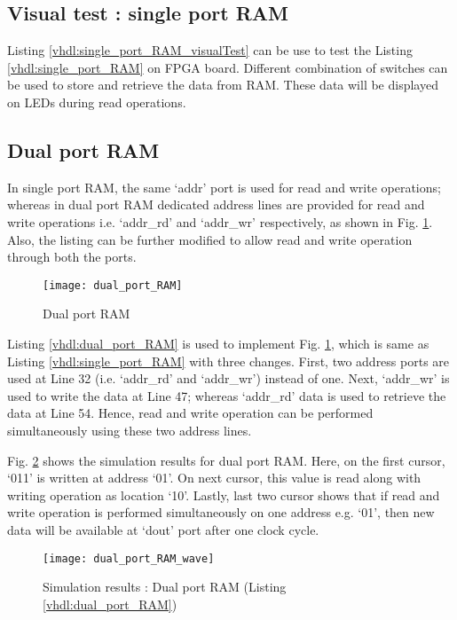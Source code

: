 

\subsection{Visual test : single port RAM}
Listing \ref{vhdl:single_port_RAM_visualTest} can be use to test the Listing \ref{vhdl:single_port_RAM} on FPGA board. Different combination of switches can be used to store and retrieve the data from RAM. These data will be displayed on LEDs during read operations. 



\subsection{Dual port RAM}
In single port RAM, the same `addr' port is used for read and write operations; whereas in dual port RAM dedicated address lines are provided for read and write operations i.e. `addr\_rd' and `addr\_wr' respectively, as shown in Fig. \ref{fig:dual_port_RAM}. Also, the listing can be further modified to allow read and write operation through both the ports. 

\begin{figure}[!h]
	\centering
	\texttt{[image: dual\_port\_RAM]}
	\caption{Dual port RAM}
	\label{fig:dual_port_RAM}
\end{figure}

Listing \ref{vhdl:dual_port_RAM} is used to implement Fig. \ref{fig:dual_port_RAM}, which is same as Listing \ref{vhdl:single_port_RAM} with three changes. First, two address ports are used at Line 32 (i.e. `addr\_rd' and `addr\_wr') instead of one. Next, `addr\_wr' is used to write the data at Line 47; whereas `addr\_rd' data is used to retrieve the data at Line 54. Hence, read and write operation can be performed simultaneously using these two address lines.

Fig. \ref{fig:dual_port_RAM_wave} shows the simulation results for dual port RAM. Here, on the first cursor, `011' is written at address `01'. On next cursor, this value is read along with writing operation as location `10'. Lastly, last two cursor shows that if read and write operation is performed simultaneously on one address e.g. `01', then new data will be available at `dout' port after one clock cycle. 
\begin{figure}[!h]
	\centering
	\texttt{[image: dual\_port\_RAM\_wave]}
	\caption{Simulation results : Dual port RAM (Listing \ref{vhdl:dual_port_RAM})}
	\label{fig:dual_port_RAM_wave}
\end{figure}

